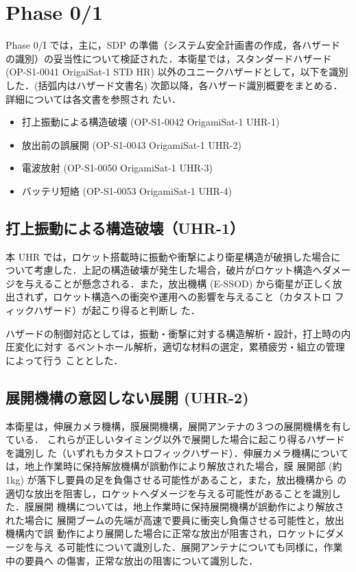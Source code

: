 \section{Phase 0/1}

Phase 0/I では，主に，SDP の準備（システム安全計画書の作成，各ハザード
  の識別）の妥当性について検証された．本衛星では，スタンダードハザード
(OP-S1-0041 OrigaiSat-1 STD HR) 
以外のユニークハザードとして，以下を識別した．(括弧内はハザード文書名)
次節以降，各ハザード識別概要をまとめる．詳細については各文書を参照され
たい．

\begin{itemize}
 \item 打上振動による構造破壊 (OP-S1-0042 OrigamiSat-1 UHR-1)
 \item 放出前の誤展開 (OP-S1-0043 OrigamiSat-1 UHR-2)
 \item 電波放射 (OP-S1-0050 OrigamiSat-1 UHR-3)
  \item バッテリ短絡 (OP-S1-0053 OrigamiSat-1 UHR-4)
\end{itemize}

\subsection{打上振動による構造破壊（UHR-1）}
本 UHR では，ロケット搭載時に振動や衝撃により衛星構造が破損した場合に
ついて考慮した．上記の構造破壊が発生した場合，破片がロケット構造へダメー
ジを与えることが懸念される．また，放出機構 (E-SSOD) から衛星が正しく放
出されず，ロケット構造への衝突や運用への影響を与えること（カタストロ
  フィックハザード）が起こり得ると判断し
た．

ハザードの制御対応としては，振動・衝撃に対する構造解析・設計，打上時の内圧変化に対す
るベントホール解析，適切な材料の選定，累積疲労・組立の管理によって行う
こととした．

\subsection{展開機構の意図しない展開 (UHR-2)}
本衛星は，伸展カメラ機構，膜展開機構，展開アンテナの３つの展開機構を有している．
これらが正しいタイミング以外で展開した場合に起こり得るハザードを識別し
た（いずれもカタストロフィックハザード）．伸展カメラ機構については，地上作業時に保持解放機構が誤動作により解放された場合，膜
展開部 (約 1kg) が落下し要員の足を負傷させる可能性があること，また，放出機構から
の適切な放出を阻害し，ロケットへダメージを与える可能性があることを識別した．膜展開
機構については，地上作業時に保持展開機構が誤動作により解放された場合に
展開ブームの先端が高速で要員に衝突し負傷させる可能性と，放出機構内で誤
動作により展開した場合に正常な放出が阻害され，ロケットにダメージを与え
る可能性について識別した．展開アンテナについても同様に，作業中の要員へ
の傷害，正常な放出の阻害について識別した．

